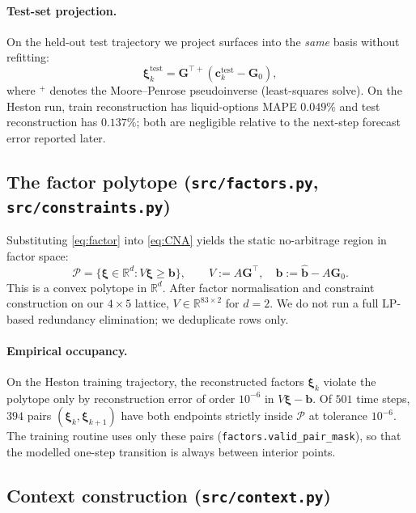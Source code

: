 \documentclass[11pt]{article}
\newcommand{\R}{\mathbb{R}}
\newcommand{\xib}{\boldsymbol{\xi}}
\newcommand{\1}{\mathbf{1}}
\begin{document}
\paragraph{Test-set projection.}
On the held-out test trajectory we project surfaces into the \emph{same} basis without refitting:
\begin{equation}
\xib_k^{\text{test}} = \mathbf G^{\top +} (\mathbf c_k^{\text{test}} - \mathbf G_0),
\end{equation}
where ${}^+$ denotes the Moore--Penrose pseudoinverse (least-squares solve). On the Heston run, train reconstruction has liquid-options MAPE $0.049\%$ and test reconstruction has $0.137\%$; both are negligible relative to the next-step forecast error reported later.

\subsection{The factor polytope (\texttt{src/factors.py}, \texttt{src/constraints.py})}

Substituting \eqref{eq:factor} into \eqref{eq:CNA} yields the static no-arbitrage region in factor space:
\begin{equation}
\mathcal P = \{ \xib \in \R^d : V \xib \ge \mathbf b\}, \qquad V := A \mathbf G^\top, \quad \mathbf b := \mathbf{\hat b} - A \mathbf G_0.
\label{eq:polytope}
\end{equation}
This is a convex polytope in $\R^d$. After factor normalisation and constraint construction on our $4 \times 5$ lattice, $V \in \R^{83 \times 2}$ for $d = 2$. We do not run a full LP-based redundancy elimination; we deduplicate rows only.

\paragraph{Empirical occupancy.}
On the Heston training trajectory, the reconstructed factors $\xib_k$ violate the polytope only by reconstruction error of order $10^{-6}$ in $V \xib - \mathbf b$. Of $501$ time steps, $394$ pairs $(\xib_k, \xib_{k+1})$ have both endpoints strictly inside $\mathcal P$ at tolerance $10^{-6}$. The training routine uses only these pairs (\texttt{factors.valid\_pair\_mask}), so that the modelled one-step transition is always between interior points.

\subsection{Context construction (\texttt{src/context.py})}
\end{document}
